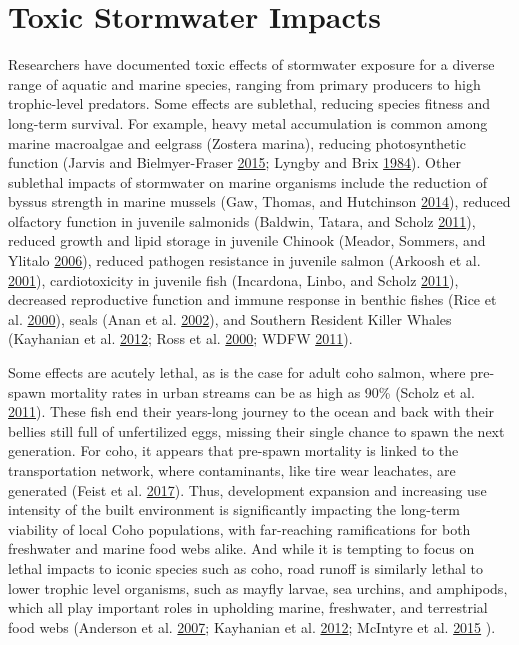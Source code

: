 \documentclass[
]{report}
\begin{document}
\hypertarget{toxic-stormwater-impacts}{%
\section{Toxic Stormwater Impacts}\label{toxic-stormwater-impacts}}

Researchers have documented toxic effects of stormwater exposure for a diverse range of aquatic and marine species, ranging from primary producers to high trophic-level predators. Some effects are sublethal, reducing species fitness and long-term survival. For example, heavy metal accumulation is common among marine macroalgae and eelgrass (Zostera marina), reducing photosynthetic function (Jarvis and Bielmyer-Fraser \protect\hyperlink{ref-Jarvis2015}{2015}; Lyngby and Brix \protect\hyperlink{ref-Lyngby1984}{1984}). Other sublethal impacts of stormwater on marine organisms include the reduction of byssus strength in marine mussels (Gaw, Thomas, and Hutchinson \protect\hyperlink{ref-Gaw2014}{2014}), reduced olfactory function in juvenile salmonids (Baldwin, Tatara, and Scholz \protect\hyperlink{ref-Baldwin2011}{2011}), reduced growth and lipid storage in juvenile Chinook (Meador, Sommers, and Ylitalo \protect\hyperlink{ref-Meador2006}{2006}), reduced pathogen resistance in juvenile salmon (Arkoosh et al. \protect\hyperlink{ref-Arkoosh2001}{2001}), cardiotoxicity in juvenile fish (Incardona, Linbo, and Scholz \protect\hyperlink{ref-Incardona2011}{2011}), decreased reproductive function and immune response in benthic fishes (Rice et al. \protect\hyperlink{ref-Rice2000}{2000}), seals (Anan et al. \protect\hyperlink{ref-Anan2002}{2002}), and Southern Resident Killer Whales (Kayhanian et al. \protect\hyperlink{ref-Kayhanian2012}{2012}; Ross et al. \protect\hyperlink{ref-Ross2000}{2000}; WDFW \protect\hyperlink{ref-WDFW2011}{2011}).

Some effects are acutely lethal, as is the case for adult coho salmon, where pre-spawn mortality rates in urban streams can be as high as 90\% (Scholz et al. \protect\hyperlink{ref-Scholz2011}{2011}). These fish end their years-long journey to the ocean and back with their bellies still full of unfertilized eggs, missing their single chance to spawn the next generation. For coho, it appears that pre-spawn mortality is linked to the transportation network, where contaminants, like tire wear leachates, are generated (Feist et al. \protect\hyperlink{ref-Feist2017}{2017}). Thus, development expansion and increasing use intensity of the built environment is significantly impacting the long-term viability of local Coho populations, with far-reaching ramifications for both freshwater and marine food webs alike. And while it is tempting to focus on lethal impacts to iconic species such as coho, road runoff is similarly lethal to lower trophic level organisms, such as mayfly larvae, sea urchins, and amphipods, which all play important roles in upholding marine, freshwater, and terrestrial food webs (Anderson et al. \protect\hyperlink{ref-Anderson2007}{2007}; Kayhanian et al. \protect\hyperlink{ref-Kayhanian2012}{2012}; McIntyre et al. \protect\hyperlink{ref-McIntyre2015}{2015} ).
\end{document}
